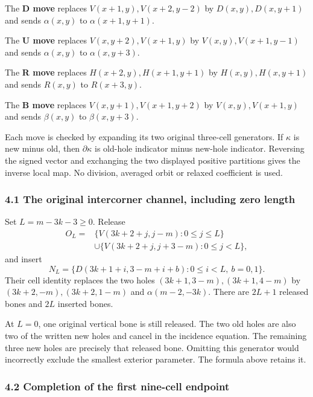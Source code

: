 The \textbf{D move} replaces \(V(x+1,y),V(x+2,y-2)\) by
\(D(x,y),D(x,y+1)\) and sends \(\alpha(x,y)\) to \(\alpha(x+1,y+1)\).

The \textbf{U move} replaces \(V(x,y+2),V(x+1,y)\) by
\(V(x,y),V(x+1,y-1)\) and sends \(\alpha(x,y)\) to \(\alpha(x,y+3)\).

The \textbf{R move} replaces \(H(x+2,y),H(x+1,y+1)\) by
\(H(x,y),H(x,y+1)\) and sends \(R(x,y)\) to \(R(x+3,y)\).

The \textbf{B move} replaces \(V(x,y+1),V(x+1,y+2)\) by
\(V(x,y),V(x+1,y)\) and sends \(\beta(x,y)\) to \(\beta(x,y+3)\).

Each move is checked by expanding its two original three-cell
generators. If \(\kappa\) is new minus old, then \(\partial\kappa\) is
old-hole indicator minus new-hole indicator. Reversing the signed vector
and exchanging the two displayed positive partitions gives the inverse
local map. No division, averaged orbit or relaxed coefficient is used.

\subsubsection{4.1 The original intercorner channel, including zero
length}\label{the-original-intercorner-channel-including-zero-length}

Set \(L=m-3k-3\ge0\). Release \[
\begin{aligned}
O_L={}&\{V(3k+2+j,j-m):0\le j\le L\}\\
 &\cup\{V(3k+2+j,j+3-m):0\le j<L\},
\end{aligned}
\] and insert \[
N_L=\{D(3k+1+i,3-m+i+b):0\le i<L,\ b=0,1\}.
\] Their cell identity replaces the two holes \((3k+1,3-m),(3k+1,4-m)\)
by \((3k+2,-m),(3k+2,1-m)\) and \(\alpha(m-2,-3k)\). There are \(2L+1\)
released bones and \(2L\) inserted bones.

At \(L=0\), one original vertical bone is still released. The two old
holes are also two of the written new holes and cancel in the incidence
equation. The remaining three new holes are precisely that released
bone. Omitting this generator would incorrectly exclude the smallest
exterior parameter. The formula above retains it.

\subsubsection{4.2 Completion of the first nine-cell
endpoint}\label{completion-of-the-first-nine-cell-endpoint}

